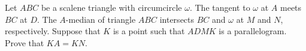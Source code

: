 Let $ABC$ be a scalene triangle with circumcircle $\omega$. The tangent to $\omega$ at $A$ meets $BC$ at $D$. The $A$-median of triangle $ABC$ intersects $BC$ and $\omega$ at $M$ and $N$,  respectively. Suppose that $K$ is a point such that $ADMK$ is a parallelogram. Prove that $KA = KN$.